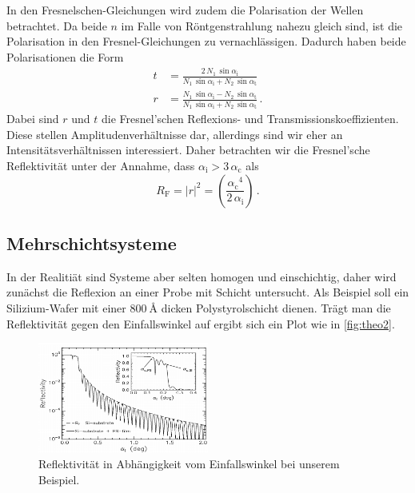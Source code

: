 In den Fresnelschen-Gleichungen wird zudem die Polarisation der Wellen betrachtet.
Da beide $n$ im Falle von Röntgenstrahlung nahezu gleich sind, ist die Polarisation in den Fresnel-Gleichungen zu vernachlässigen.
Dadurch haben beide Polarisationen die Form
\begin{align}
    t &= \frac{2 \, N_1 \, \sin{\alpha _\text{i}} }{N_1 \, \sin{\alpha _\text{i}} + N_2 \, \sin{\alpha _\text{t}}} \\
    r &= \frac{N_1 \, \sin{\alpha _\text{i}} - N_2 \, \sin{\alpha _\text{t}}}{N_1 \, \sin{\alpha _\text{i}} + N_2 \, \sin{\alpha _\text{t}}} \,.
\end{align}
Dabei sind $r$ und $t$ die Fresnel'schen Reflexions- und Transmissionskoeffizienten. 
Diese stellen Amplitudenverhältnisse dar, allerdings sind wir eher an Intensitätsverhältnissen interessiert.
Daher betrachten wir die Fresnel'sche Reflektivität unter der Annahme, dass $\alpha _\text{i} > 3 \, \alpha _\text{c}$ als 
\begin{equation}
    R_\text{F} = |r|^2 = \left( \frac{{\alpha _\text{c}}^4}{2 \, \alpha _\text{i}}  \right) \,.
    \label{eq:reflek}
\end{equation}

\subsection{Mehrschichtsysteme}
\label{theo2}

In der Realitiät sind Systeme aber selten homogen und einschichtig, daher wird zunächst die Reflexion an einer Probe mit Schicht untersucht.
Als Beispiel soll ein Silizium-Wafer mit einer $\SI{800}{\angstrom}$ dicken Polystyrolschicht dienen. 
Trägt man die Reflektivität gegen den Einfallswinkel auf ergibt sich ein Plot wie in \autoref{fig:theo2}.

\begin{figure}
    \centering
    \includegraphics[width=0.5\textwidth]{images/plot.png}
    \caption{Reflektivität in Abhängigkeit vom Einfallswinkel bei unserem Beispiel. \cite{V44old}}
    \label{fig:theo2}
\end{figure}

